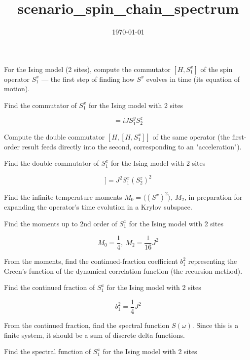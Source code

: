 \documentclass[dvipdfmx]{article}
\title{scenario\_spin\_chain\_spectrum}
\date{\today}
\begin{document}
\maketitle

For the Ising model (2 sites), compute the commutator $[H,S^x_1]$ of the spin operator $S^x_1$ — the first step of finding how $S^x$ evolves in time (its equation of motion).

Find the commutator of $S^x_1$ for the Ising model with 2 sites

\begin{equation}
  [H, S^{x}_{1}] = i J S^{y}_{1} S^{z}_{2}
  \label{eq:E1}
\end{equation}

Compute the double commutator $[H,[H,S^x_1]]$ of the same operator (the first-order result feeds directly into the second, corresponding to an "acceleration").

Find the double commutator of $S^x_1$ for the Ising model with 2 sites

\begin{equation}
  [H, [H, S^{x}_{1}]] = J^{2} S^{x}_{1} \left(S^{z}_{2}\right)^{2}
  \label{eq:E2}
\end{equation}

Find the infinite-temperature moments $M_0=\langle(S^x)^2\rangle,\,M_2$, in preparation for expanding the operator's time evolution in a Krylov subspace.

Find the moments up to 2nd order of $S^x_1$ for the Ising model with 2 sites

\begin{equation}
  M_{0} = \frac{1}{4},\ M_{2} = \frac{1}{16} J^{2}
  \label{eq:E3}
\end{equation}

From the moments, find the continued-fraction coefficient $b_1^2$ representing the Green's function of the dynamical correlation function (the recursion method).

Find the continued fraction of $S^x_1$ for the Ising model with 2 sites

\begin{equation}
  b_{1}^2 = \frac{1}{4} J^{2}
  \label{eq:E4}
\end{equation}

From the continued fraction, find the spectral function $S(\omega)$. Since this is a finite system, it should be a sum of discrete delta functions.

Find the spectral function of $S^x_1$ for the Ising model with 2 sites
\end{document}
